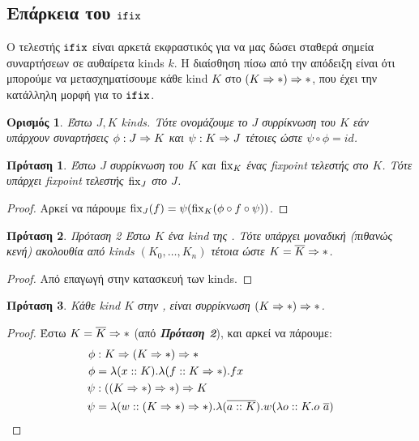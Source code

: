 \subsection{Επάρκεια του $\operatorname{\texttt{ifix}}$} \label{subsec:adifix}

Ο τελεστής $\operatorname{\texttt{ifix}}$ είναι αρκετά εκφραστικός για να μας δώσει σταθερά σημεία
συναρτήσεων σε αυθαίρετα kinds $k$. Η διαίσθηση πίσω από την απόδειξη είναι ότι
μπορούμε να μετασχηματίσουμε κάθε kind $K$ στο $(K \Rightarrow \operatorname{\ast}) \Rightarrow
\operatorname{\ast}$, που έχει την κατάλληλη μορφή για το $\operatorname{\texttt{ifix}}$.


        \newtheorem{definition}{Ορισμός} \begin{definition} Έστω $J, Κ$ kinds.
          Τότε ονομάζουμε το $J$ \emph{συρρίκνωση} του $K$ εάν υπάρχουν
          συναρτήσεις $\phi: J \Rightarrow K$ και $\psi : K \Rightarrow J$
        τέτοιες ώστε $\psi \circ \phi = id$.  \end{definition}

        \newtheorem{proposition}{Πρόταση} \begin{proposition}
          \label{prop:retracts-fixed-points} Έστω $J$ συρρίκνωση του $K$ και
          $\operatorname{fix}_K$ ένας fixpoint τελεστής στο $K$.  Τότε υπάρχει fixpoint
          τελεστής $\operatorname{fix}_J$ στο $J$.  \end{proposition}

        \newtheorem{proof}{Απόδειξη} \begin{proof} Αρκεί να πάρουμε $\operatorname{fix}_J(f)
        = \psi (\operatorname{fix}_K (\phi \circ f \circ \psi))$.  \end{proof}

        \begin{proposition}{Πρόταση 2} \label{prop:kind-structure} Έστω $K$ ένα
          kind της \FOMF{}. Τότε υπάρχει μοναδική (πιθανώς κενή) ακολουθία από
          kinds $(K_0, \dots, K_n)$  τέτοια ώστε $K = \overline{K} \Rightarrow
          \operatorname{\ast}$.  \end{proposition} \begin{proof} Από επαγωγή στην κατασκευή
        των kinds.  \end{proof}

        \begin{proposition} Κάθε kind $K$ στην \FOMF{}, είναι συρρίκνωση $(K
        \Rightarrow \operatorname{\ast}) \Rightarrow \operatorname{\ast}$.  \end{proposition} \begin{proof}
          Έστω $K = \overline{K} \Rightarrow \operatorname{\ast}$ (από \textbf{\textit{Πρόταση
          2}}), και αρκεί να πάρουμε: \begin{align*} \phi &: K \Rightarrow (K
            \Rightarrow \operatorname{\ast}) \Rightarrow \operatorname{\ast} \\ \phi &= \lambda (x :: K) .
            \lambda (f :: K \Rightarrow \operatorname{\ast}) . f x\\ \psi &: ((K \Rightarrow
            \operatorname{\ast}) \Rightarrow \operatorname{\ast}) \Rightarrow K\\ \psi &= \lambda (w :: (K
          \Rightarrow \operatorname{\ast}) \Rightarrow \operatorname{\ast}) . \lambda (\overline{a :: K}) . w
          (\lambda o :: K . o\ \overline{a}) \end{align*} \end{proof}

